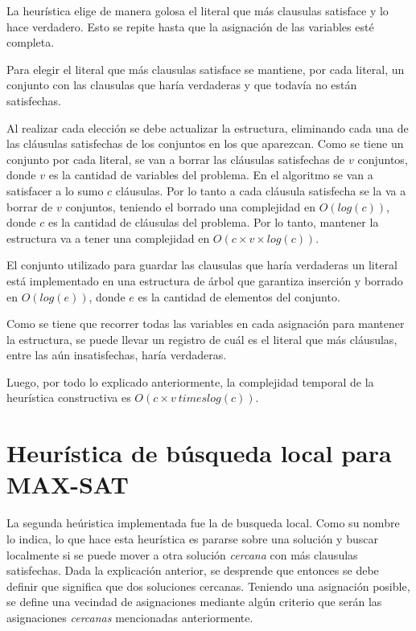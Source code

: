 \documentclass[a4paper,10pt]{article}
\begin{document}
La heurística elige de manera golosa el literal que más clausulas satisface y lo hace verdadero. Esto se repite hasta que la asignación de las variables esté completa.

Para elegir el literal que más clausulas satisface se mantiene, por cada literal, un conjunto con las clausulas que haría verdaderas y que todavía no están satisfechas.

Al realizar cada elección se debe actualizar la estructura, eliminando cada una de las cláusulas satisfechas de los conjuntos en los que aparezcan. Como se tiene un conjunto por cada literal, se van a borrar las cláusulas satisfechas de $v$ conjuntos, donde $v$ es la cantidad de variables del problema. En el algoritmo se van a satisfacer a lo sumo $c$ cláusulas. Por lo tanto a cada cláusula satisfecha se la va a borrar de $v$ conjuntos, teniendo el borrado una complejidad en $O\left( log \left( c \right) \right)$, donde $c$ es la cantidad de cláusulas del problema. Por lo tanto, mantener la estructura va a tener una complejidad en $O\left( c \times v \times log \left( c \right) \right)$.

El conjunto utilizado para guardar las clausulas que haría verdaderas un literal está implementado en una estructura de árbol que garantiza inserción y borrado en $O\left( log \left( e \right) \right)$, donde $e$ es la cantidad de elementos del conjunto.

Como se tiene que recorrer todas las variables en cada asignación para mantener la estructura, se puede llevar un registro de cuál es el literal que más cláusulas, entre las aún insatisfechas, haría verdaderas. 

Luego, por todo lo explicado anteriormente, la complejidad temporal de la heur\'istica constructiva es $O\left( c \times v \ times log \left( c \right) \right)$.



\section*{Heur\'istica de b\'usqueda local para MAX-SAT}

La segunda he\'uristica implementada fue la de busqueda local. Como su nombre lo indica, lo que hace esta heur\'istica es pararse sobre una soluci\'on y buscar localmente si se puede mover a otra soluci\'on \emph{cercana} con m\'as clausulas satisfechas. Dada la explicaci\'on anterior, se desprende que entonces se debe definir que significa que dos soluciones cercanas. Teniendo una asignaci\'on posible, se define una vecindad de asignaciones mediante alg\'un criterio que ser\'an las asignaciones \emph{cercanas} mencionadas anteriormente.
\end{document}
